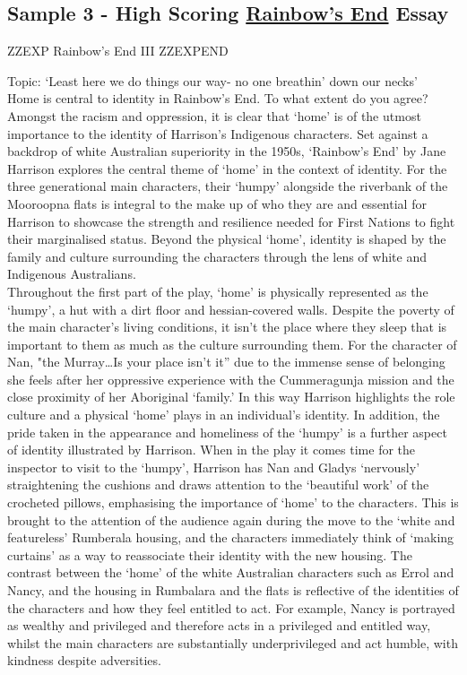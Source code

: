 \documentclass[a4paper]{article}
\begin{document}
\subsection{Sample 3 - High Scoring \underline{Rainbow's End} Essay}


ZZEXP Rainbow's End III ZZEXPEND



Topic: ‘Least here we do things our way- no one breathin’ down our necks’\\
Home is central to identity in Rainbow’s End.
To what extent do you agree?\\

Amongst the racism and oppression, it is clear that ‘home’ is of the utmost importance to the
identity of Harrison’s Indigenous characters. Set against a backdrop of white Australian
superiority in the 1950s, ‘Rainbow’s End’ by Jane Harrison explores the central theme of
‘home’ in the context of identity. For the three generational main characters, their ‘humpy’
alongside the riverbank of the Mooroopna flats is integral to the make up of who they are
and essential for Harrison to showcase the strength and resilience needed for First Nations
to fight their marginalised status. Beyond the physical ‘home’, identity is shaped by the family
and culture surrounding the characters through the lens of white and Indigenous Australians.\\

Throughout the first part of the play, ‘home’ is physically represented as the ‘humpy’, a hut
with a dirt floor and hessian-covered walls. Despite the poverty of the main character’s living
conditions, it isn’t the place where they sleep that is important to them as much as the
culture surrounding them. For the character of Nan, "the Murray…Is your place isn’t it” due to
the immense sense of belonging she feels after her oppressive experience with the
Cummeragunja mission and the close proximity of her Aboriginal ‘family.’ In this way
Harrison highlights the role culture and a physical ‘home’ plays in an individual's identity. In
addition, the pride taken in the appearance and homeliness of the ‘humpy’ is a further aspect
of identity illustrated by Harrison. When in the play it comes time for the inspector to visit to
the ‘humpy’, Harrison has Nan and Gladys ‘nervously’ straightening the cushions and draws
attention to the ‘beautiful work’ of the crocheted pillows, emphasising the importance of
‘home’ to the characters. This is brought to the attention of the audience again during the
move to the ‘white and featureless’ Rumberala housing, and the characters immediately
think of ‘making curtains’ as a way to reassociate their identity with the new housing. The
contrast between the ‘home’ of the white Australian characters such as Errol and Nancy, and
the housing in Rumbalara and the flats is reflective of the identities of the characters and
how they feel entitled to act. For example, Nancy is portrayed as wealthy and privileged and
therefore acts in a privileged and entitled way, whilst the main characters are substantially
underprivileged and act humble, with kindness despite adversities.\\
\end{document}
